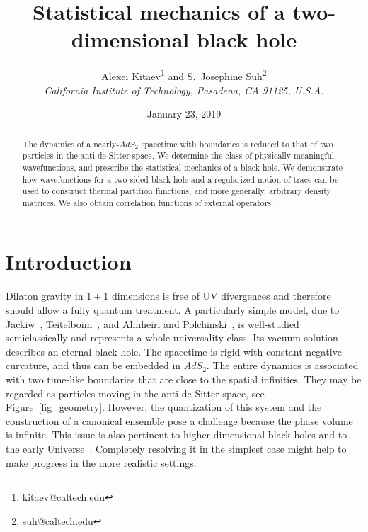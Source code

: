 \documentclass[11pt]{article}
\title {Statistical mechanics of a two-dimensional black hole}
\author{Alexei Kitaev\footnote{kitaev@caltech.edu}\; and
S.\ Josephine Suh\footnote{suh@caltech.edu}\\
\normalsize\it California Institute of Technology, Pasadena, CA 91125, U.S.A.\vspace{0.5cm}}
\date{January 23, 2019}
\DeclareMathOperator{\AdS}{AdS}
\def\widetilde#1{#1}%
\def\AdS{AdS}
\begin{document}
\setcounter{tocdepth}{2}

\maketitle
\begin{abstract}
The dynamics of a nearly-$\AdS_2$ spacetime with boundaries is reduced to that of two particles in the anti-de Sitter space. We determine the class of physically meaningful wavefunctions, and prescribe the statistical mechanics of a black hole. We demonstrate how wavefunctions for a two-sided black hole and a regularized notion of trace can be used to construct thermal partition functions, and more generally, arbitrary density matrices. We also obtain correlation functions of external operators.
\end{abstract}

\newpage
\tableofcontents
\newpage

\section{Introduction}

Dilaton gravity in $1+1$ dimensions is free of UV divergences and therefore should allow a fully quantum treatment. A particularly simple model, due to Jackiw~\cite{Ja85}, Teitelboim~\cite{Te83}, and Almheiri and Polchinski~\cite{AlPo14}, is well-studied semiclassically and represents a whole universality class. Its vacuum solution describes an eternal black hole. The spacetime is rigid with constant negative curvature, and thus can be embedded in $\widetilde{\AdS}_2$. The entire dynamics is associated with two time-like boundaries that are close to the spatial infinities. They may be regarded as particles moving in the anti-de Sitter space, see Figure~\ref{fig_geometry}. However, the quantization of this system and the construction of a canonical ensemble pose a challenge because the phase volume is infinite. This issue is also pertinent to higher-dimensional black holes and to the early Universe~\cite{HaHa83}. Completely resolving it in the simplest case might help to make progress in the more realistic settings.
\end{document}
